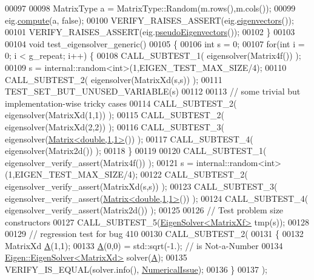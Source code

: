 \begin{DoxyCode}
00097 
00098   MatrixType a = MatrixType::Random(m.rows(),m.cols());
00099   eig.\hyperlink{group___eigenvalues___module_a38d032b75b3e75640e3db42e7ab20c24}{compute}(a, \textcolor{keyword}{false});
00100   VERIFY\_RAISES\_ASSERT(eig.\hyperlink{group___eigenvalues___module_a66288022802172e3ee059283b26201d7}{eigenvectors}());
00101   VERIFY\_RAISES\_ASSERT(eig.\hyperlink{group___eigenvalues___module_a4e796226f06e1f7347cf03a38755a155}{pseudoEigenvectors}());
00102 \}
00103 
00104 \textcolor{keywordtype}{void} test\_eigensolver\_generic()
00105 \{
00106   \textcolor{keywordtype}{int} s = 0;
00107   \textcolor{keywordflow}{for}(\textcolor{keywordtype}{int} i = 0; i < g\_repeat; i++) \{
00108     CALL\_SUBTEST\_1( eigensolver(Matrix4f()) );
00109     s = internal::random<int>(1,EIGEN\_TEST\_MAX\_SIZE/4);
00110     CALL\_SUBTEST\_2( eigensolver(MatrixXd(s,s)) );
00111     TEST\_SET\_BUT\_UNUSED\_VARIABLE(s)
00112 
00113     \textcolor{comment}{// some trivial but implementation-wise tricky cases}
00114     CALL\_SUBTEST\_2( eigensolver(MatrixXd(1,1)) );
00115     CALL\_SUBTEST\_2( eigensolver(MatrixXd(2,2)) );
00116     CALL\_SUBTEST\_3( eigensolver(\hyperlink{group___core___module_class_eigen_1_1_matrix}{Matrix<double,1,1>}()) );
00117     CALL\_SUBTEST\_4( eigensolver(Matrix2d()) );
00118   \}
00119 
00120   CALL\_SUBTEST\_1( eigensolver\_verify\_assert(Matrix4f()) );
00121   s = internal::random<int>(1,EIGEN\_TEST\_MAX\_SIZE/4);
00122   CALL\_SUBTEST\_2( eigensolver\_verify\_assert(MatrixXd(s,s)) );
00123   CALL\_SUBTEST\_3( eigensolver\_verify\_assert(\hyperlink{group___core___module_class_eigen_1_1_matrix}{Matrix<double,1,1>}()) );
00124   CALL\_SUBTEST\_4( eigensolver\_verify\_assert(Matrix2d()) );
00125 
00126   \textcolor{comment}{// Test problem size constructors}
00127   CALL\_SUBTEST\_5(\hyperlink{group___eigenvalues___module_class_eigen_1_1_eigen_solver}{EigenSolver<MatrixXf>} tmp(s));
00128 
00129   \textcolor{comment}{// regression test for bug 410}
00130   CALL\_SUBTEST\_2(
00131   \{
00132      MatrixXd \hyperlink{group___core___module_class_eigen_1_1_matrix}{A}(1,1);
00133      \hyperlink{group___core___module_class_eigen_1_1_matrix}{A}(0,0) = std::sqrt(-1.); \textcolor{comment}{// is Not-a-Number}
00134      \hyperlink{group___eigenvalues___module_class_eigen_1_1_eigen_solver}{Eigen::EigenSolver<MatrixXd>} solver(\hyperlink{group___core___module_class_eigen_1_1_matrix}{A});
00135      VERIFY\_IS\_EQUAL(solver.info(), \hyperlink{group__enums_gga85fad7b87587764e5cf6b513a9e0ee5eaaf9b736d310a664e7729d163a035cc5f}{NumericalIssue});
00136   \}
00137   );

\end{DoxyCode}
